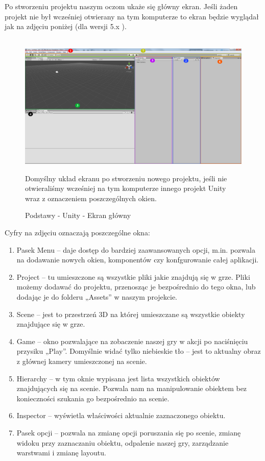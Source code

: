 \documentclass[12pt]{xmgr}
\begin{document}
Po stworzeniu projektu naszym oczom ukaże się główny ekran. Jeśli żaden projekt nie był wcześniej otwierany na tym komputerze to ekran będzie wyglądał jak na zdjęciu poniżej (dla wersji 5.x ).
\\
\\
\begin{figure}[!htb]
    \begin{center}
    \includegraphics[scale=0.15]{Screeny/rodzial5screeny/ekran_glowny}
    \end{center}
    \caption{Podstawy - Unity - Ekran główny}
    Domyślny układ ekranu po stworzeniu nowego projektu, jeśli nie otwieraliśmy wcześniej na tym komputerze innego projekt Unity wraz z oznaczeniem poszczególnych okien.
\end{figure}

Cyfry na zdjęciu oznaczają poszczególne okna:

\begin{enumerate}
  \item Pasek Menu – daje dostęp do bardziej zaawansowanych opcji, m.in. pozwala na dodawanie nowych okien, komponentów czy konfgurowanie całej aplikacji.
  \item  Project – tu umieszczone są wszystkie pliki jakie znajdują się w grze. Pliki możemy dodawać do projektu, przenosząc je bezpośrednio do tego okna, lub dodając je do folderu „Assets” w naszym projekcie.
  \item Scene – jest to przestrzeń 3D na której umieszczane są wszystkie obiekty znajdujące się w grze.
  \item Game – okno pozwalające na zobaczenie naszej gry w akcji po naciśnięciu przysiku „Play”. Domyślnie widać tylko niebieskie tło – jest to aktualny obraz z głównej kamery umieszczonej na scenie.
  \item Hierarchy – w tym oknie wypisana jest lista wszystkich obiektów znajdujących się na scenie. Pozwala nam na manipulowanie obiektem bez konieczności szukania go bezpośrednio na scenie.
  \item Inspector – wyświetla właściwości aktualnie zaznaczonego obiektu.
  \item  Pasek opcji – pozwala na zmianę opcji poruszania się po scenie, zmianę widoku przy zaznaczaniu obiektu, odpalenie naszej gry, zarządzanie warstwami i zmianę layoutu.
\end{enumerate}
\end{document}
